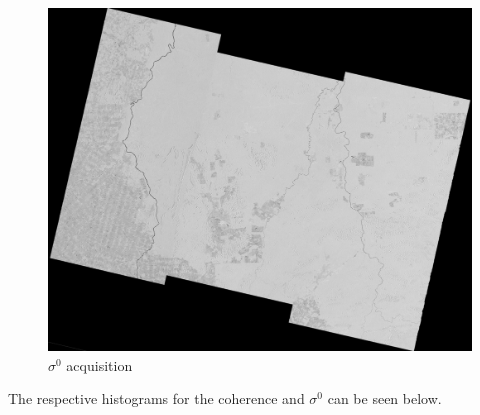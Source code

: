 \begin{figure}[H]
    \centering
    \includegraphics[width=0.75\linewidth]{Chapter5/SENTINEL1/geo_temp_sigma0dbimage.pdf}
    \caption{$\sigma^0$ acquisition}
    \label{fig:sigma_sentinel}
\end{figure}{}

\newpage
The respective histograms for the coherence and $\sigma^0$ can be seen below.

